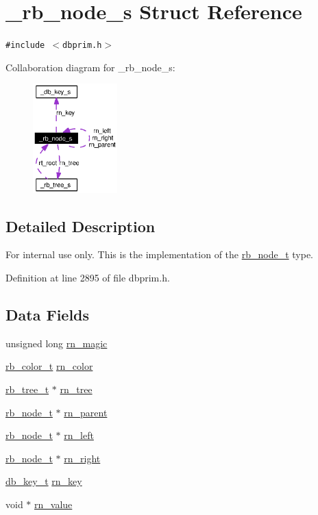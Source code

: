 \hypertarget{struct__rb__node__s}{
\section{\_\-rb\_\-node\_\-s Struct Reference}
\label{struct__rb__node__s}
}
{\tt \#include $<$dbprim.h$>$}

Collaboration diagram for \_\-rb\_\-node\_\-s:\begin{figure}[H]
\begin{center}
\leavevmode
\includegraphics[width=92pt]{struct__rb__node__s__coll__graph}
\end{center}
\end{figure}


\subsection{Detailed Description}
\begin{Desc}
\item[For internal use only.]
This is the implementation of the \hyperlink{group__dbprim__rbtree_ga1}{rb\_\-node\_\-t} type.\end{Desc}




Definition at line 2895 of file dbprim.h.\subsection*{Data Fields}
\begin{CompactItemize}
\item 
unsigned long \hyperlink{struct__rb__node__s_o0}{rn\_\-magic}
\item 
\hyperlink{group__dbprim__rbtree_ga4}{rb\_\-color\_\-t} \hyperlink{struct__rb__node__s_o1}{rn\_\-color}
\item 
\hyperlink{struct__rb__tree__s}{rb\_\-tree\_\-t} $\ast$ \hyperlink{struct__rb__node__s_o2}{rn\_\-tree}
\item 
\hyperlink{struct__rb__node__s}{rb\_\-node\_\-t} $\ast$ \hyperlink{struct__rb__node__s_o3}{rn\_\-parent}
\item 
\hyperlink{struct__rb__node__s}{rb\_\-node\_\-t} $\ast$ \hyperlink{struct__rb__node__s_o4}{rn\_\-left}
\item 
\hyperlink{struct__rb__node__s}{rb\_\-node\_\-t} $\ast$ \hyperlink{struct__rb__node__s_o5}{rn\_\-right}
\item 
\hyperlink{struct__db__key__s}{db\_\-key\_\-t} \hyperlink{struct__rb__node__s_o6}{rn\_\-key}
\item 
void $\ast$ \hyperlink{struct__rb__node__s_o7}{rn\_\-value}
\end{CompactItemize}


